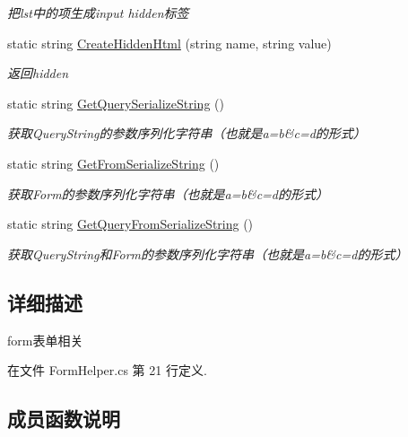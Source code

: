 \begin{DoxyCompactItemize}
\begin{DoxyCompactList}\small\item\em 把lst中的项生成input hidden标签 \end{DoxyCompactList}\item 
static string \hyperlink{class_x_c_l_net_tools_1_1_string_hander_1_1_form_helper_a3df398dd109cfe76da34602149d16410}{Create\+Hidden\+Html} (string name, string value)
\begin{DoxyCompactList}\small\item\em 返回hidden \end{DoxyCompactList}\item 
static string \hyperlink{class_x_c_l_net_tools_1_1_string_hander_1_1_form_helper_ab3d6c0e951ba151fe5efc423854bbff4}{Get\+Query\+Serialize\+String} ()
\begin{DoxyCompactList}\small\item\em 获取\+Query\+String的参数序列化字符串（也就是a=b\&c=d的形式） \end{DoxyCompactList}\item 
static string \hyperlink{class_x_c_l_net_tools_1_1_string_hander_1_1_form_helper_aa8048660a078480db6e41f2f3050c651}{Get\+From\+Serialize\+String} ()
\begin{DoxyCompactList}\small\item\em 获取\+Form的参数序列化字符串（也就是a=b\&c=d的形式） \end{DoxyCompactList}\item 
static string \hyperlink{class_x_c_l_net_tools_1_1_string_hander_1_1_form_helper_a9c3363c3f41771f044634f9e8050dc55}{Get\+Query\+From\+Serialize\+String} ()
\begin{DoxyCompactList}\small\item\em 获取\+Query\+String和\+Form的参数序列化字符串（也就是a=b\&c=d的形式） \end{DoxyCompactList}\end{DoxyCompactItemize}


\subsection{详细描述}
form表单相关 



在文件 Form\+Helper.\+cs 第 21 行定义.



\subsection{成员函数说明}
